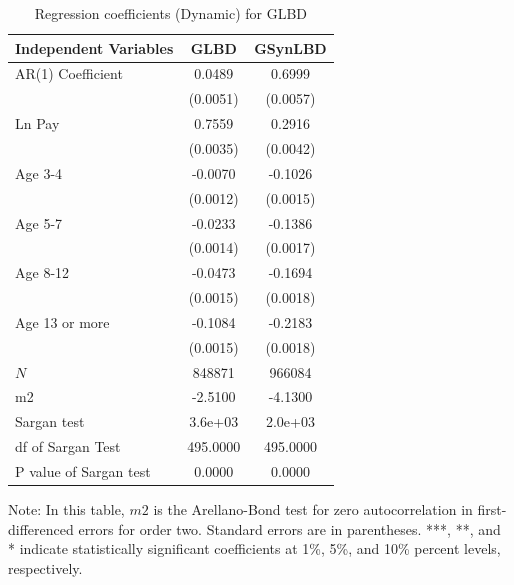 \documentclass[10pt,twoside]{article}
\newcommand{\sym}[1]{\rlap{#1}}
\begin{document}
\begin{table}[H]
  \centering
\caption{Regression coefficients (Dynamic) for GLBD} \label{tab:Dynamic - GMM_ger} \medskip
\renewcommand{\arraystretch}{1}
\setlength{\tabcolsep}{13pt}
\begin{tabular}{l|c |c}
\toprule
\textbf{Independent Variables}&\textbf{GLBD} &\textbf{GSynLBD}\\
\midrule
AR(1) Coefficient&   0.0489\sym{***}&   0.6999\sym{***}\\
          & (0.0051)         & (0.0057)         \\
[1em]
Ln Pay    &   0.7559\sym{***}&   0.2916\sym{***}\\
          & (0.0035)         & (0.0042)         \\
[1em]
Age 3-4   &  -0.0070\sym{***}&  -0.1026\sym{***}\\
          & (0.0012)         & (0.0015)         \\
[1em]
Age 5-7   &  -0.0233\sym{***}&  -0.1386\sym{***}\\
          & (0.0014)         & (0.0017)         \\
[1em]
Age 8-12  &  -0.0473\sym{***}&  -0.1694\sym{***}\\
          & (0.0015)         & (0.0018)         \\
[1em]
Age 13 or more&  -0.1084\sym{***}&  -0.2183\sym{***}\\
          & (0.0015)         & (0.0018)         \\
\hline
\(N\)     &   848871         &   966084         \\
m2        &  -2.5100         &  -4.1300         \\
Sargan test&  3.6e+03         &  2.0e+03         \\
df of Sargan Test& 495.0000         & 495.0000         \\
P value of Sargan test&   0.0000         &   0.0000         \\
    \bottomrule
  \end{tabular} 
\begin{tablenotes}
\small
\item Note: In this table, $m2$ is the Arellano-Bond test for zero autocorrelation in first-differenced errors for order two. Standard errors are in parentheses. ***, **, and * indicate statistically significant coefficients at 1\%, 5\%, and 10\% percent levels, respectively.
 \end{tablenotes}
\end{table}
\end{document}

